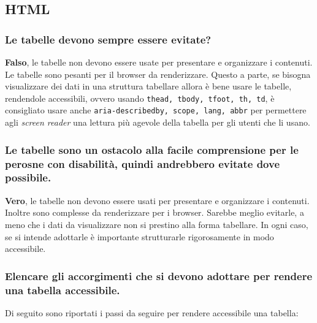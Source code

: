 \documentclass[12pt]{article}
\begin{document}
\subsection{HTML}

\subsubsection{Le tabelle devono sempre essere evitate?}

\textbf{Falso}, le tabelle non devono essere usate per presentare e organizzare
i contenuti. Le tabelle sono pesanti per il browser da renderizzare. Questo a
parte, se bisogna visualizzare dei dati in una struttura tabellare allora è bene
usare le tabelle, rendendole accessibili, ovvero usando
\lstinline{thead, tbody, tfoot, th, td}, è consigliato usare anche
\lstinline{aria-describedby, scope, lang, abbr} per permettere agli
\textit{screen reader} una lettura più agevole della tabella per gli utenti che
li usano.

\subsubsection{Le tabelle sono un ostacolo alla facile comprensione per le
	perosne con disabilità, quindi andrebbero evitate dove possibile.}

\textbf{Vero}, le tabelle non devono essere usati per presentare e organizzare i
contenuti. Inoltre sono complesse da renderizzare per i browser. Sarebbe meglio
evitarle, a meno che i dati da visualizzare non si prestino alla forma
tabellare. In ogni caso, se si intende adottarle è importante strutturarle
rigorosamente in modo accessibile.

\subsubsection{Elencare gli accorgimenti che si devono adottare per rendere una
	tabella accessibile.}

Di seguito sono riportati i passi da seguire per rendere accessibile una
tabella:
\end{document}

